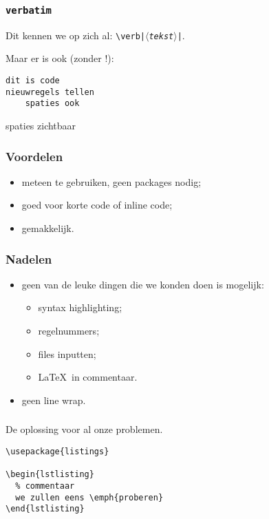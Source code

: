 \begin{frame}[fragile]
  \frametitle{\texttt{verbatim}}

  Dit kennen we op zich al: \texttt{\textcolor{uagreen}{\textbackslash verb}|$\langle$\textsl{tekst}$\rangle$|}.

  Maar er is ook (zonder !):
  \begin{LTXexample}
\begin{verbatim}
dit is code
nieuwregels tellen
    spaties ook
\end{verbatim}
  \end{LTXexample}

  \begin{LTXexample}
\begin{verbatim*}
    spaties zichtbaar
\end{verbatim*}
  \end{LTXexample}
\end{frame}

\begin{frame}
  \frametitle{Voordelen}

  \begin{itemize}
    \item meteen te gebruiken, geen packages nodig;
    \item goed voor korte code of inline code;
    \item gemakkelijk.
  \end{itemize}
\end{frame}

\begin{frame}
  \frametitle{Nadelen}

  \begin{itemize}
    \item geen van de leuke dingen die we konden doen is mogelijk:
      \begin{itemize}
        \item syntax highlighting;
        \item regelnummers;
        \item files inputten;
        \item \LaTeX\ in commentaar.
      \end{itemize}
    \item geen line wrap.
  \end{itemize}
\end{frame}

\begin{frame}[fragile]
  \frametitle{}

  De oplossing voor al onze problemen.
  \begin{verbatim}
\usepackage{listings}

\begin{lstlisting}
  % commentaar
  we zullen eens \emph{proberen}
\end{lstlisting}
\end{verbatim}
\end{frame}

